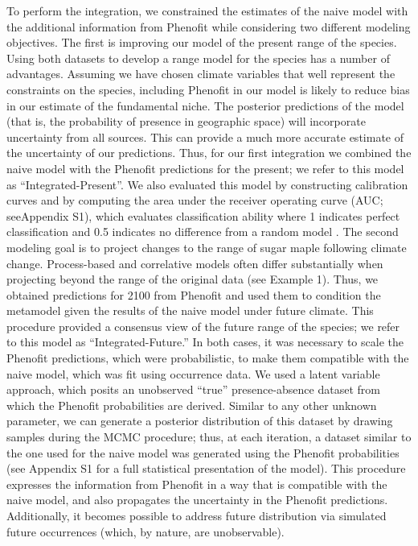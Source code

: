 \documentclass[11pt]{article}
\newcommand{\rev}[1]{{\color{RoyalBlue}#1}}
\begin{document}
To perform the integration, we constrained the estimates of the naive model with the additional information from Phenofit while considering two different modeling objectives.
The first is improving our model of the present range of the species.
Using both datasets to develop a range model for the species has a number of advantages.
Assuming we have chosen climate variables that well represent the constraints on the species, including Phenofit in our model is likely to reduce bias in our estimate of the fundamental niche.
The posterior predictions of the model (that is, the probability of presence in geographic space) will incorporate uncertainty from all sources.
This can provide a much more accurate estimate of the uncertainty of our predictions.
Thus, for our first integration we combined the naive model with the Phenofit predictions for the present; we refer to this model as ``Integrated-Present''.
\rev{We also evaluated this model by constructing calibration curves and by computing the area under the receiver operating curve (AUC; seeAppendix S1), which evaluates classification ability where 1 indicates perfect classification and 0.5 indicates no difference from a random model \citep{Swets1988}.}
The second modeling goal is to project changes to the range of sugar maple following climate change.
Process-based and correlative models often differ substantially when projecting beyond the range of the original data (see Example 1).
Thus, we obtained predictions for 2100 from Phenofit \citep{Morin2009} and used them to condition the metamodel given the results of the naive model under future climate.
This procedure provided a consensus view of the future range of the species; we refer to this model as ``Integrated-Future.''
\rev{In both cases, it was necessary to scale the Phenofit predictions, which were probabilistic, to make them compatible with the naive model, which was fit using occurrence data.
We used a latent variable approach, which posits an unobserved ``true'' presence-absence dataset from which the Phenofit probabilities are derived. 
Similar to any other unknown parameter, we can generate a posterior distribution of this dataset by drawing samples during the MCMC procedure; thus, at each iteration, a dataset similar to the one used for the naive model was generated using the Phenofit probabilities (see Appendix S1 for a full statistical presentation of the model).
This procedure expresses the information from Phenofit in a way that is compatible with the naive model, and also propagates the uncertainty in the Phenofit predictions.
Additionally, it becomes possible to address future distribution via simulated future occurrences (which, by nature, are unobservable).}
\end{document}
